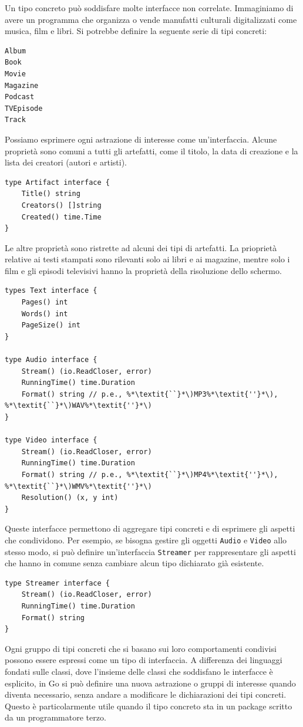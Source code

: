Un tipo concreto può soddisfare molte interfacce non correlate.
Immaginiamo di avere un programma che organizza o vende manufatti culturali digitalizzati come musica, film e libri.
Si potrebbe definire la seguente serie di tipi concreti:
\begin{lstlisting}[frame=single, label={lst:lstlisting6-3.4}]
Album
Book
Movie
Magazine
Podcast
TVEpisode
Track
\end{lstlisting}
Possiamo esprimere ogni astrazione di interesse come un'interfaccia.
Alcune proprietà sono comuni a tutti gli artefatti, come il titolo, la data di creazione e la lista dei creatori (autori e artisti).
\begin{lstlisting}[frame=single, label={lst:lstlisting6-3.5}]
type Artifact interface {
    Title() string
    Creators() []string
    Created() time.Time
}
\end{lstlisting}
Le altre proprietà sono ristrette ad alcuni dei tipi di artefatti.
La prioprietà relative ai testi stampati sono rilevanti solo ai libri e ai magazine, mentre solo i film e gli episodi televisivi hanno la proprietà della risoluzione dello schermo.
\begin{lstlisting}[frame=single, label={lst:lstlisting6-3.6}]
types Text interface {
    Pages() int
    Words() int
    PageSize() int
}

type Audio interface {
    Stream() (io.ReadCloser, error)
    RunningTime() time.Duration
    Format() string // p.e., %*\textit{``}*\)MP3%*\textit{''}*\), %*\textit{``}*\)WAV%*\textit{''}*\)
}

type Video interface {
    Stream() (io.ReadCloser, error)
    RunningTime() time.Duration
    Format() string // p.e., %*\textit{``}*\)MP4%*\textit{''}*\), %*\textit{``}*\)WMV%*\textit{''}*\)
    Resolution() (x, y int)
}
\end{lstlisting}
Queste interfacce permettono di aggregare tipi concreti e di esprimere gli aspetti che condividono.
Per esempio, se bisogna gestire gli oggetti \verb|Audio| e \verb|Video| allo stesso modo, si può definire un'interfaccia \verb|Streamer| per rappresentare gli aspetti che hanno in comune senza cambiare alcun tipo dichiarato già esistente.
\begin{lstlisting}[frame=single, label={lst:lstlisting6-3.7}]
type Streamer interface {
    Stream() (io.ReadCloser, error)
    RunningTime() time.Duration
    Format() string
}
\end{lstlisting}
Ogni gruppo di tipi concreti che si basano sui loro comportamenti condivisi possono essere espressi come un tipo di interfaccia.
A differenza dei linguaggi fondati sulle classi, dove l'insieme delle classi che soddisfano le interfacce è esplicito, in Go si può definire una nuova astrazione o gruppi di interesse quando diventa necessario, senza andare a modificare le dichiarazioni dei tipi concreti.
Questo è particolarmente utile quando il tipo concreto sta in un package scritto da un programmatore terzo.


